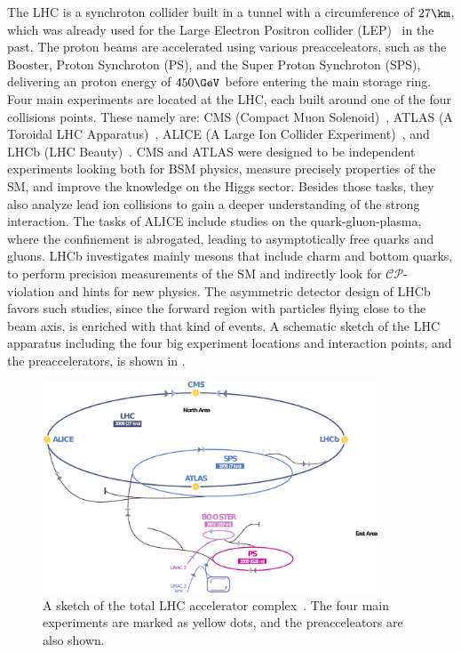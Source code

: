 The LHC is a synchroton collider built in a tunnel with a circumference of $27\km$, which was already used for the Large Electron Positron collider (LEP)~\cite{LEPCollider} in the past. The proton beams are accelerated using various preacceleators, such as the Booster, Proton Synchroton (PS), and the Super Proton Synchroton (SPS), delivering an proton energy of $450\GeV$ before entering the main storage ring. Four main experiments are located at the LHC, each built around one of the four collisions points. These namely are: CMS (Compact Muon Solenoid)~\cite{CMS}, ATLAS (A Toroidal LHC Apparatus)~\cite{ATLAS}, ALICE (A Large Ion Collider Experiment)~\cite{ALICE}, and LHCb (LHC Beauty)~\cite{LHCb}. CMS and ATLAS were designed to be independent experiments looking both for BSM physics, measure precisely properties of the SM, and improve the knowledge on the Higgs sector. Besides those tasks, they also analyze lead ion collisions to gain a deeper understanding of the strong interaction. The tasks of ALICE include studies on the quark-gluon-plasma, where the confinement is abrogated, leading to asymptotically free quarks and gluons. LHCb investigates mainly mesons that include charm and bottom quarks, to perform precision measurements of the SM and indirectly look for $\mathcal{CP}$-violation and hints for new physics. The asymmetric detector design of LHCb favors such studies, since the forward region with particles flying close to the beam axis, is enriched with that kind of events. A schematic sketch of the LHC apparatus including the four big experiment locations and interaction points, and the preaccelerators, is shown in .\\
\begin{figure}[hbtp]
 \centering
 \includegraphics[width=0.89\textwidth]{figures/general/LHC}
 \caption{A sketch of the total LHC accelerator complex~\cite{LHCPicture}. The four main experiments are marked as yellow dots, and the preacceleators are also shown.}
 \label{fig:LHC}
\end{figure}
